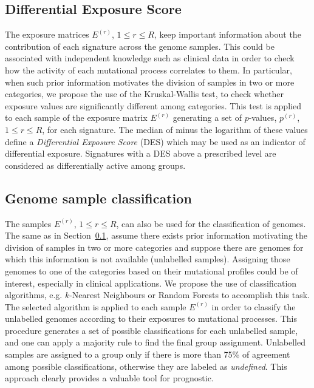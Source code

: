 \documentclass{bioinfo}
\begin{document}
\subsection{Differential Exposure Score}\label{sec:DES}
The exposure matrices $E^{(r)}$, $1 \leq r \leq R$, keep important
information about the contribution of each signature across the genome
samples. This could be associated with independent knowledge such as
clinical data in order to check how the activity of each mutational
process correlates to them. In particular, when such prior information
motivates the division of samples in two or more categories, we
propose the use of the Kruskal-Wallis test, to check whether exposure
values are significantly different among categories. This test is
applied to each sample of the exposure matrix $E^{(r)}$ generating a
set of $p$-values, $p^{(r)}$, $1 \leq r \leq R$, for each
signature. The median of minus the logarithm of these values define a
\emph{Differential Exposure Score} (DES) which may be used as an
indicator of differential exposure.  Signatures with a DES above a
prescribed level are considered as differentially active among groups.

\subsection{Genome sample classification}
The samples $E^{(r)}$, $1\leq r\leq R$, can also be used for the
classification of genomes. The same as in Section~\ref{sec:DES},
assume there exists prior information motivating the
division of samples in two or more categories and suppose there are
genomes for which this information is not available 
(unlabelled samples). Assigning those genomes to one of the categories 
based on their mutational profiles could be of interest, especially
in clinical applications. We propose the use of classification
algorithms, e.g. $k$-Nearest Neighbours or Random Forests to
accomplish this task. The selected algorithm is applied to each 
sample $E^{(r)}$ in order to classify the unlabelled
genomes according to their exposures to mutational processes.
This procedure generates a set of possible classifications
for each unlabelled sample, and one can apply a majority rule to find
the final group assignment.  Unlabelled samples are assigned
to a group only if there is more than 75\% of agreement among possible
classifications, otherwise they are labeled as \textit{undefined}. 
This approach clearly provides a valuable tool for prognostic.
\end{document}
